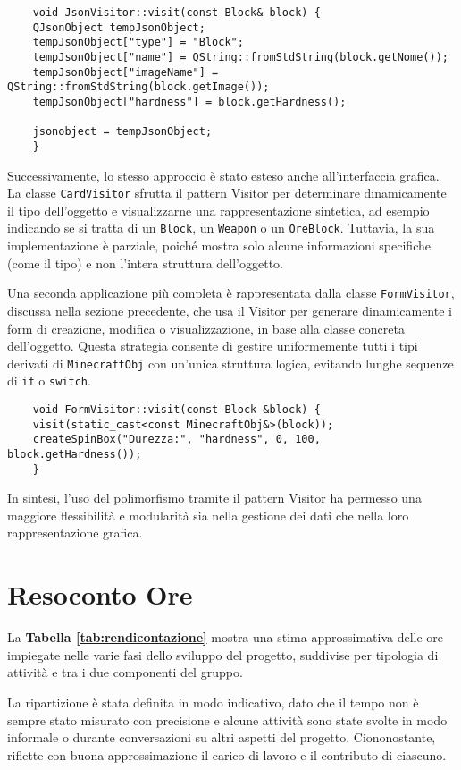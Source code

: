 \documentclass[a4paper,12pt]{article}
\begin{document}
\begin{lstlisting}
    void JsonVisitor::visit(const Block& block) {
    QJsonObject tempJsonObject;
    tempJsonObject["type"] = "Block";
    tempJsonObject["name"] = QString::fromStdString(block.getNome());
    tempJsonObject["imageName"] = QString::fromStdString(block.getImage());
    tempJsonObject["hardness"] = block.getHardness();
    
    jsonobject = tempJsonObject;
    }
\end{lstlisting}

Successivamente, lo stesso approccio è stato esteso anche all'interfaccia grafica.  
La classe \texttt{CardVisitor} sfrutta il pattern Visitor per determinare dinamicamente il tipo dell’oggetto e visualizzarne una rappresentazione sintetica, ad esempio indicando se si tratta di un \texttt{Block}, un \texttt{Weapon} o un \texttt{OreBlock}.  
Tuttavia, la sua implementazione è parziale, poiché mostra solo alcune informazioni specifiche (come il tipo) e non l'intera struttura dell’oggetto.

Una seconda applicazione più completa è rappresentata dalla classe \texttt{FormVisitor}, discussa nella sezione precedente, che usa il Visitor per generare dinamicamente i form di creazione, modifica o visualizzazione, in base alla classe concreta dell’oggetto.  
Questa strategia consente di gestire uniformemente tutti i tipi derivati di \texttt{MinecraftObj} con un'unica struttura logica, evitando lunghe sequenze di \texttt{if} o \texttt{switch}.

\begin{lstlisting}
    void FormVisitor::visit(const Block &block) {
    visit(static_cast<const MinecraftObj&>(block));
    createSpinBox("Durezza:", "hardness", 0, 100, block.getHardness());
    }
\end{lstlisting}

In sintesi, l’uso del polimorfismo tramite il pattern Visitor ha permesso una maggiore flessibilità e modularità sia nella gestione dei dati che nella loro rappresentazione grafica.

\section{Resoconto Ore}
La \textbf{Tabella \ref{tab:rendicontazione}} mostra una stima approssimativa delle ore impiegate nelle varie fasi dello sviluppo del progetto, suddivise per tipologia di attività e tra i due componenti del gruppo.

La ripartizione è stata definita in modo indicativo, dato che il tempo non è sempre stato misurato con precisione e alcune attività sono state svolte in modo informale o durante conversazioni su altri aspetti del progetto. Ciononostante, riflette con buona approssimazione il carico di lavoro e il contributo di ciascuno.
\end{document}
